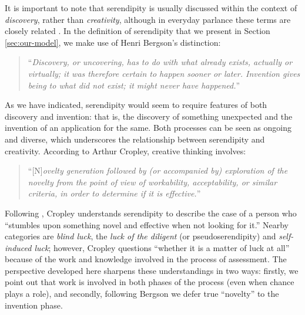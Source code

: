 It is important to note that serendipity is usually discussed within
the context of \emph{discovery}, rather than \emph{creativity},
although in everyday parlance these terms are closely related
\cite{jordanous12jims}.  In the definition of serendipity that we present in Section \ref{sec:our-model}, we make use
of Henri Bergson's distinction:
\begin{quote}
``\emph{Discovery, or uncovering, has to do with what already exists,
    actually or virtually; it was therefore certain to happen sooner
    or later.  Invention gives being to what did not exist; it might
    never have happened.}''~\cite[p. 58]{bergson2010creative}
\end{quote}
As we have indicated, serendipity would seem to require features of
both discovery and invention: that is, the discovery of something
unexpected and the invention of an application for the same.  Both
processes can be seen as ongoing and diverse, which underscores the
relationship between serendipity and creativity.  According to Arthur
Cropley, creative thinking involves:
\begin{quote}
``{[}N{]}\emph{ovelty generation followed by (or accompanied by) exploration of the novelty from the point of view of workability, acceptability, or similar criteria, in order to determine if it is effective.}'' \cite{cropley2006praise}
\end{quote}
Following \cite{austin2003chase}, Cropley understands serendipity to
describe the case of a person who ``stumbles upon something novel and
effective when not looking for it.''  Nearby categories are
\emph{blind luck}, the \emph{luck of the diligent} (or
pseudoserendipity) and \emph{self-induced luck}; however, Cropley
questions ``whether it is a matter of luck at all'' because of the
work and knowledge involved in the process of assessment.
%
The perspective developed here sharpens these understandings in two ways:
firstly, we point out that work is involved in both phases of the process (even when chance plays a role), and secondly, following Bergson we defer true ``novelty'' to the invention phase.

